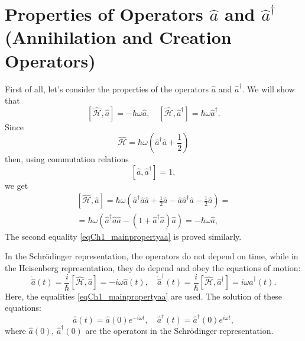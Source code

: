 \section{Properties of Operators $ \hat a $ and $ \hat a ^\dag $ (Annihilation and Creation Operators)} 

First of all, let's consider the properties of the operators $\hat{a}$ and $\hat{a}^{\dag}$. We will show that 
\begin{equation}
\left[\hat{\mathcal{H}}, \hat{a}\right] = 
- \hbar \omega \hat{a}, \quad
\left[\hat{\mathcal{H}}, \hat{a}^{\dag}\right] = 
\hbar \omega \hat{a}^{\dag}.
\label{eqCh1_mainpropertyaa}
\end{equation}
Since  
\[
\hat{\mathcal{H}} =  
\hbar \omega \left(\hat{a}^{\dag} \hat{a} +
\frac{1}{2}\right)
\]
then, using commutation relations
\[
\left[\hat{a}, \hat{a}^{\dag}\right] = 1,
\]  
we get
\begin{eqnarray}
\left[\hat{\mathcal{H}}, \hat{a}\right] = 
\hbar \omega \left( 
\hat{a}^{\dag}\hat{a}\hat{a} + \frac{1}{2} \hat{a} -
\hat{a}\hat{a}^{\dag}\hat{a} - \frac{1}{2}\hat{a} 
\right)
= 
\nonumber \\ 
= \hbar \omega\left(
\hat{a}^{\dag}\hat{a}\hat{a} - \left(1 + \hat{a}^{\dag}\hat{a}\right)\hat{a} 
\right) = - \hbar \omega \hat{a} 
,
\nonumber
\end{eqnarray}
The second equality \eqref{eqCh1_mainpropertyaa} is proved similarly. 

In the Schrödinger representation, the operators do not depend on time, while in the Heisenberg representation, they do depend and obey the equations of motion: 
\begin{equation}
\dot{\hat{a}}\left(t\right) = \frac{i}{\hbar}\left[\hat{\mathcal{H}},
  \hat{a}\right] = -i \omega \hat{a}\left(t\right), \quad
\dot{\hat{a}}^{\dag}\left(t\right) = \frac{i}{\hbar}\left[\hat{\mathcal{H}},
  \hat{a}^{\dag}\right] = i \omega \hat{a}^{\dag}\left(t\right).
\label{eqCh1_54}
\end{equation}
Here, the equalities \eqref{eqCh1_mainpropertyaa} are used. The solution of these equations: 
\begin{equation}
\hat{a}\left(t\right) = \hat{a}\left(0\right) e^{- i \omega t}, \quad
\hat{a}^{\dag}\left(t\right) = \hat{a}^{\dag}\left(0\right) e^{i \omega t}, 
\end{equation}
where $\hat{a}\left(0\right)$, $\hat{a}^{\dag}\left(0\right)$ are the operators in the Schrödinger representation.